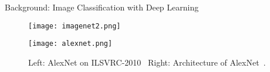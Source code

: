 \begin{refsection}
  \begin{frame}{Background: Image Classification with Deep Learning}
    \begin{figure}
      \centering
      \begin{minipage}{0.48\linewidth}
        \centering
        \texttt{[image: imagenet2.png]}
      \end{minipage}\hfill
      \begin{minipage}{0.48\linewidth}
        \centering
        \texttt{[image: alexnet.png]}
      \end{minipage}
      \caption[]{\scriptsize Left: AlexNet on ILSVRC-2010~\parencite{imagenet2010challenge} \quad Right: Architecture of AlexNet~\parencite{krizhevskyImageNetClassificationDeep2012}.}
    \end{figure}
    \bottomleftrefs
  \end{frame}
\end{refsection}



